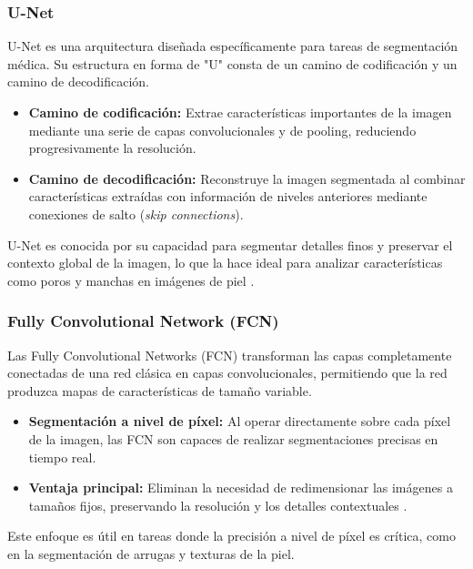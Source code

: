 \subsubsection{U-Net}  
U-Net es una arquitectura diseñada específicamente para tareas de segmentación médica. Su estructura en forma de "U" consta de un camino de codificación y un camino de decodificación.  
\begin{itemize}
    \item \textbf{Camino de codificación:} Extrae características importantes de la imagen mediante una serie de capas convolucionales y de pooling, reduciendo progresivamente la resolución.
    \item \textbf{Camino de decodificación:} Reconstruye la imagen segmentada al combinar características extraídas con información de niveles anteriores mediante conexiones de salto (\textit{skip connections}).
\end{itemize}  
U-Net es conocida por su capacidad para segmentar detalles finos y preservar el contexto global de la imagen, lo que la hace ideal para analizar características como poros y manchas en imágenes de piel \cite{autor2020unet}.

\subsubsection{Fully Convolutional Network (FCN)}  
Las Fully Convolutional Networks (FCN) transforman las capas completamente conectadas de una red clásica en capas convolucionales, permitiendo que la red produzca mapas de características de tamaño variable.  
\begin{itemize}
    \item \textbf{Segmentación a nivel de píxel:} Al operar directamente sobre cada píxel de la imagen, las FCN son capaces de realizar segmentaciones precisas en tiempo real.
    \item \textbf{Ventaja principal:} Eliminan la necesidad de redimensionar las imágenes a tamaños fijos, preservando la resolución y los detalles contextuales \cite{autor2019fcn}.
\end{itemize}  
Este enfoque es útil en tareas donde la precisión a nivel de píxel es crítica, como en la segmentación de arrugas y texturas de la piel.

